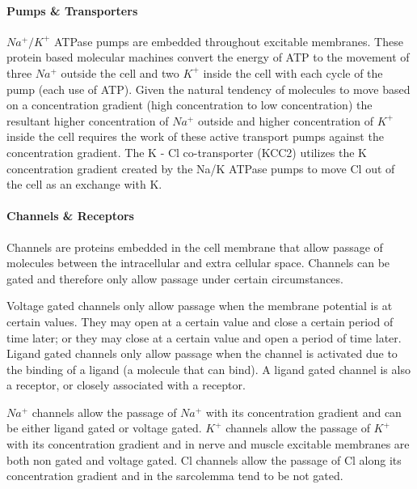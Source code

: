 \paragraph{Pumps \& Transporters}
$Na^+/K^+$ ATPase pumps are embedded throughout excitable membranes. These protein based molecular machines convert the energy of ATP to the movement of three $Na^+$ outside the cell and two $K^+$ inside the cell with each cycle of the pump (each use of ATP). Given the natural tendency of molecules to move based on a concentration gradient (high concentration to low concentration) the resultant higher concentration of  $Na^+$ outside and higher concentration of $K^+$ inside the cell requires the work of these active transport pumps against the concentration gradient.
The K - Cl co-transporter (KCC2) utilizes the K concentration gradient created by the Na/K ATPase pumps to move Cl out of the cell as an exchange with K.




\paragraph{Channels \& Receptors}
Channels are proteins embedded in the cell membrane that allow passage of molecules between the intracellular and extra cellular space. Channels can be gated and therefore only allow passage under certain circumstances. 

Voltage gated channels only allow passage when the membrane potential is at certain values. They may open at a certain value and close a certain period of time later; or they may close at a certain value and open a period of time later. 
Ligand gated channels only allow passage when the channel is activated due to the binding of a ligand (a molecule that can bind). A ligand gated channel is also a receptor, or closely associated with a receptor. 

$Na^+$ channels allow the passage of $Na^+$ with its concentration gradient and can be either ligand gated or voltage gated. $K^+$ channels allow the passage of $K^+$ with its concentration gradient and in nerve and muscle excitable membranes are both non gated and voltage gated. Cl channels allow the passage of Cl along its concentration gradient and in the sarcolemma tend to be not gated.

